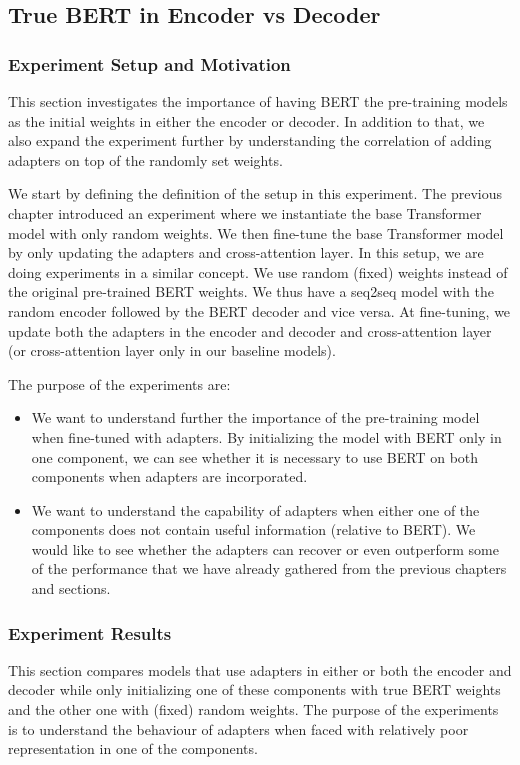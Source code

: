 \subsection{True BERT in Encoder vs Decoder}
\label{sec:pospre}
\subsubsection{Experiment Setup and Motivation}
This section investigates the importance of having BERT the pre-training models as the initial weights in either the encoder or decoder. In addition to that, we also expand the experiment further by understanding the correlation of adding adapters on top of the randomly set weights.

We start by defining the definition of the setup in this experiment. The previous chapter introduced an experiment where we instantiate the base Transformer model with only random weights. We then fine-tune the base Transformer model by only updating the adapters and cross-attention layer. In this setup, we are doing experiments in a similar concept. We use random (fixed) weights instead of the original pre-trained BERT weights. We thus have a seq2seq model with the random encoder followed by the BERT decoder and vice versa. At fine-tuning, we update both the adapters in the encoder and decoder and cross-attention layer (or cross-attention layer only in our baseline models).

The purpose of the experiments are:
\begin{itemize}
    \item We want to understand further the importance of the pre-training model when fine-tuned with adapters. By initializing the model with BERT only in one component, we can see whether it is necessary to use BERT on both components when adapters are incorporated.
    \item We want to understand the capability of adapters when either one of the components does not contain useful information (relative to BERT). We would like to see whether the adapters can recover or even outperform some of the performance that we have already gathered from the previous chapters and sections.
\end{itemize}

\subsubsection{Experiment Results}
This section compares models that use adapters in either or both the encoder and decoder while only initializing one of these components with true BERT weights and the other one with (fixed) random weights. The purpose of the experiments is to understand the behaviour of adapters when faced with relatively poor representation in one of the components.

